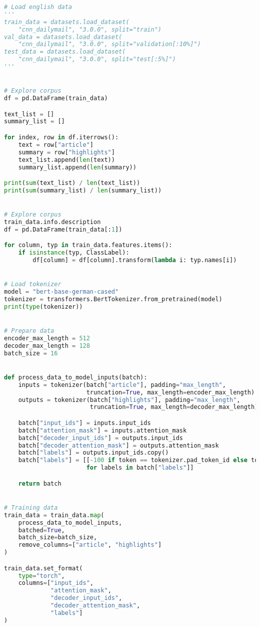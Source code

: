 \begin{lstlisting}[language=Python, caption=Quellcode zum Training]
# Load english data
'''
train_data = datasets.load_dataset(
    "cnn_dailymail", "3.0.0", split="train")
val_data = datasets.load_dataset(
    "cnn_dailymail", "3.0.0", split="validation[:10%]")
test_data = datasets.load_dataset(
    "cnn_dailymail", "3.0.0", split="test[:5%]")
'''


# Explore corpus
df = pd.DataFrame(train_data)

text_list = []
summary_list = []

for index, row in df.iterrows():
    text = row["article"]
    summary = row["highlights"]
    text_list.append(len(text))
    summary_list.append(len(summary))

print(sum(text_list) / len(text_list))
print(sum(summary_list) / len(summary_list))


# Explore corpus
train_data.info.description
df = pd.DataFrame(train_data[:1])

for column, typ in train_data.features.items():
    if isinstance(typ, ClassLabel):
        df[column] = df[column].transform(lambda i: typ.names[i])


# Load tokenizer
model = "bert-base-german-cased"
tokenizer = transformers.BertTokenizer.from_pretrained(model)
print(type(tokenizer))


# Prepare data
encoder_max_length = 512
decoder_max_length = 128
batch_size = 16


def process_data_to_model_inputs(batch):
    inputs = tokenizer(batch["article"], padding="max_length",
                       truncation=True, max_length=encoder_max_length)
    outputs = tokenizer(batch["highlights"], padding="max_length",
                        truncation=True, max_length=decoder_max_length)

    batch["input_ids"] = inputs.input_ids
    batch["attention_mask"] = inputs.attention_mask
    batch["decoder_input_ids"] = outputs.input_ids
    batch["decoder_attention_mask"] = outputs.attention_mask
    batch["labels"] = outputs.input_ids.copy()
    batch["labels"] = [[-100 if token == tokenizer.pad_token_id else token for token in labels]
                       for labels in batch["labels"]]

    return batch


# Training data
train_data = train_data.map(
    process_data_to_model_inputs,
    batched=True,
    batch_size=batch_size,
    remove_columns=["article", "highlights"]
)

train_data.set_format(
    type="torch",
    columns=["input_ids",
             "attention_mask",
             "decoder_input_ids",
             "decoder_attention_mask",
             "labels"]
)



\end{lstlisting}
